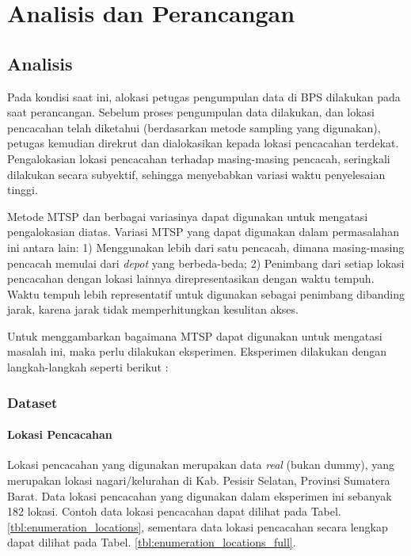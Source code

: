  \chapter{Analisis dan Perancangan}


\section{Analisis}

Pada kondisi saat ini, alokasi petugas pengumpulan data di BPS dilakukan pada saat perancangan. Sebelum proses pengumpulan data dilakukan, dan lokasi pencacahan telah diketahui (berdasarkan metode sampling yang digunakan), petugas kemudian direkrut dan dialokasikan kepada lokasi pencacahan terdekat. Pengalokasian lokasi pencacahan terhadap masing-masing pencacah, seringkali dilakukan secara subyektif, sehingga menyebabkan variasi waktu penyelesaian tinggi. 


Metode MTSP dan berbagai variasinya dapat digunakan untuk mengatasi pengalokasian diatas. Variasi MTSP yang dapat digunakan dalam permasalahan ini antara lain: 1) Menggunakan lebih dari satu pencacah, dimana masing-masing pencacah memulai dari \textit{depot} yang berbeda-beda; 2) Penimbang dari setiap lokasi pencacahan dengan lokasi lainnya direpresentasikan dengan waktu tempuh. Waktu tempuh lebih representatif untuk digunakan sebagai penimbang dibanding jarak, karena jarak tidak memperhitungkan kesulitan akses. 


Untuk menggambarkan bagaimana MTSP dapat digunakan untuk mengatasi masalah ini, maka perlu dilakukan eksperimen. Eksperimen dilakukan dengan langkah-langkah seperti berikut :


\subsection{Dataset}

\subsubsection{Lokasi Pencacahan}

Lokasi pencacahan yang digunakan merupakan data \textit{real} (bukan dummy), yang merupakan lokasi nagari/kelurahan di Kab. Pesisir Selatan, Provinsi Sumatera Barat. Data lokasi pencacahan yang digunakan dalam eksperimen ini sebanyak 182 lokasi. Contoh data lokasi pencacahan dapat dilihat pada Tabel. \ref{tbl:enumeration_locations}, sementara data lokasi pencacahan secara lengkap dapat dilihat pada Tabel. \ref{tbl:enumeration_locations_full}.


